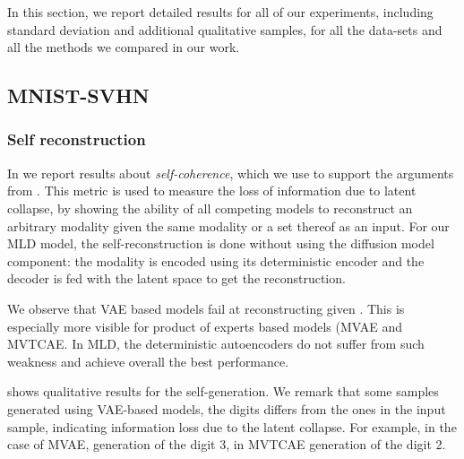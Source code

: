 In this section, we report detailed results for all of our experiments, including standard deviation and additional qualitative samples, for all the data-sets and all the methods we compared in our work.

\subsection{MNIST-SVHN}

\subsubsection{Self reconstruction}

In   we report results about \textit{self-coherence}, which we use to support the arguments from . This metric is used to measure the loss of information due to latent collapse, by showing the ability of all competing models to reconstruct an arbitrary modality given the same modality or a set thereof as an input. For our \gls{MLD} model, the self-reconstruction is done without using the diffusion model component: the modality is encoded using its deterministic encoder and the decoder is fed with the latent space to get the reconstruction. 

We observe that \gls{VAE} based models fail at reconstructing \svhn given \svhn. This is especially more visible for product of experts based models (\gls{MVAE} and \gls{MVTCAE}. In \gls{MLD}, the deterministic autoencoders do not suffer from such weakness and achieve overall the best performance. 

 shows qualitative results for the self-generation. We remark that some samples generated using \gls{VAE}-based models, the digits differs from the ones in the input sample, indicating information loss due to the latent collapse. For example, in the case of \gls{MVAE}, generation of the \mnist digit 3, in \gls{MVTCAE} generation of the \svhn digit 2. 




